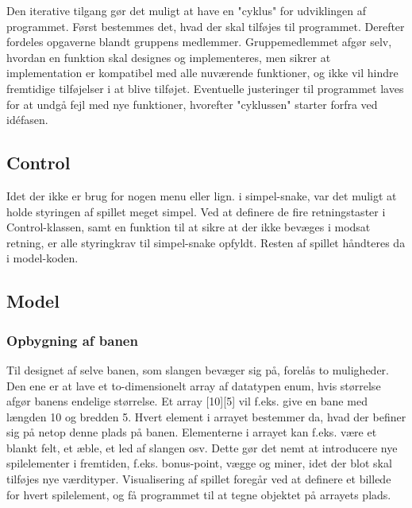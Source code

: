 \documentclass{report}
\begin{document}
Den iterative tilgang gør det muligt at have en "cyklus" for udviklingen af programmet. Først bestemmes det, hvad der skal tilføjes til programmet. Derefter fordeles opgaverne blandt gruppens medlemmer. Gruppemedlemmet afgør selv, hvordan en funktion skal designes og implementeres, men sikrer at implementation er kompatibel med alle nuværende funktioner, og ikke vil hindre fremtidige tilføjelser i at blive tilføjet. Eventuelle justeringer til programmet laves for at undgå fejl med nye funktioner, hvorefter "cyklussen" starter forfra ved idéfasen.

\subsection{Control}
Idet der ikke er brug for nogen menu eller lign. i simpel-snake, var det muligt at holde styringen af spillet meget simpel. Ved at definere de fire retningstaster i Control-klassen, samt en funktion til at sikre at der ikke bevæges i modsat retning, er alle styringkrav til simpel-snake opfyldt. Resten af spillet håndteres da i model-koden.

\subsection{Model}
\subsubsection{Opbygning af banen}
Til designet af selve banen, som slangen bevæger sig på, forelås to muligheder. Den ene er at lave et to-dimensionelt array af datatypen enum, hvis størrelse afgør banens endelige størrelse. Et array [10][5] vil f.eks. give en bane med længden 10 og bredden 5. Hvert element i arrayet bestemmer da, hvad der befiner sig på netop denne plads på banen. Elementerne i arrayet kan f.eks. være et blankt felt, et æble, et led af slangen osv. Dette gør det nemt at introducere nye spilelementer i fremtiden, f.eks. bonus-point, vægge og miner, idet der blot skal tilføjes nye værdityper. Visualisering af spillet foregår ved at definere et billede for hvert spilelement, og få programmet til at tegne objektet på arrayets plads.
\end{document}
